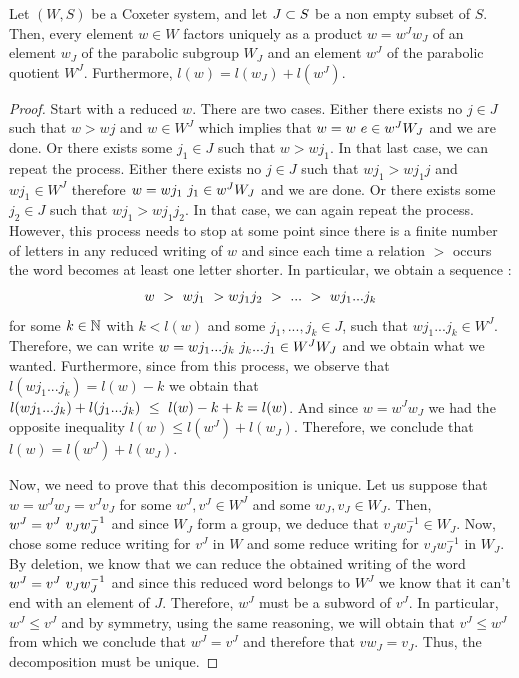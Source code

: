 \begin{proposition}
	Let $(W,S)$ be a Coxeter system, and let $J\subset S$ be a non empty subset of $S$. Then, every element $w\in W$ factors uniquely as a product $w=w^Jw_J$ of an element $w_J$ of the parabolic subgroup $W_J$ and an element $w^J$ of the parabolic quotient $W^J$. Furthermore, $l(w)=l(w_J)+l(w^J)$.
\end{proposition}
\begin{proof}
	Start with a reduced $w$. There are two cases. Either there exists no $j\in J$ such that $w>wj$ and $w\in W^J$ which implies that $w=w\text{ } e\in w^JW_J$ and we are done. Or there exists some $j_1\in J$ such that $w>wj_1$. In that last case, we can repeat the process. Either there exists no $j\in J$ such that $wj_1>wj_1j$ and $wj_1\in W^J$ therefore $w=wj_1\text{ } j_1\in w^JW_J$ and we are done. Or there exists some $j_2\in J$ such that $wj_1>wj_1j_2$. In that case, we can again repeat the process. However, this process needs to stop at some point since there is a finite number of letters in any reduced writing of $w$ and since each time a relation $>$ occurs the word becomes at least one letter shorter. In particular, we obtain a sequence :
	\begin{equation}
	w\text{ } >\text{ } wj_1\text{ } >wj_1j_2\text{ } >\text{ } ...\text{ } >\text{ } wj_1...j_k
	\end{equation}
	for some $k\in\mathbb N$ with $k<l(w)$ and some $j_1,...,j_k\in J$, such that $wj_1...j_k\in W^J$. Therefore, we can write $w=wj_1...j_k\text{ } j_k...j_1\in W^JW_J$ and we obtain what we wanted. Furthermore, since from this process, we observe that $l(wj_1...j_k)=l(w)-k$ we obtain that $l(wj_1...j_k)+l(j_1...j_k)\text{ }\leq \text{ } l(w)-k+k=l(w)$. And since $w=w^Jw_J$ we had the opposite inequality $l(w)\leq l(w^J)+l(w_J)$. Therefore, we conclude that $l(w)=l(w^J)+l(w_J)$.

	Now, we need to prove that this decomposition is unique. Let us suppose that $w=w^Jw_J=v^Jv_J$ for some $w^J,v^J\in W^J$ and some $w_J,v_J\in W_J$. Then, $w^J=v^J\text{ } v_Jw_{J}^{-1}$ and since $W_J$ form a group, we deduce that $v_Jw_{J}^{-1}\in W_J$. Now, chose some reduce writing for $v^J$ in $W$ and some reduce writing for $v_Jw_J^{-1}$ in $W_J$. By deletion, we know that we can reduce the obtained writing of the word $w^J=v^J\text{ } v_Jw_{J}^{-1}$ and since this reduced word belongs to $W^J$ we know that it can't end with an element of $J$. Therefore, $w^J$ must be a subword of $v^J$. In particular, $w^J\leq v^J$ and by symmetry, using the same reasoning, we will obtain that $v^J\leq w^J$ from which we conclude that $w^J=v^J$ and therefore that $vw_J=v_J$. Thus, the decomposition must be unique.
\end{proof}

